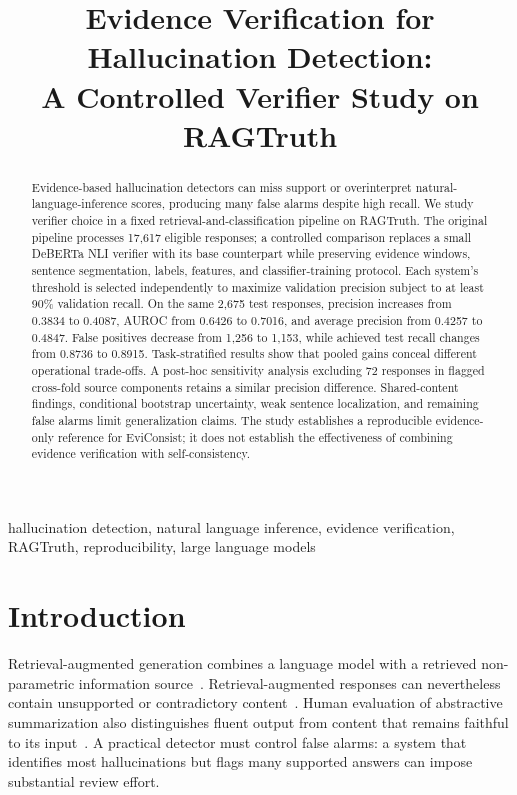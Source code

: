 \documentclass[conference,a4paper]{IEEEtran}
\title{Evidence Verification for Hallucination Detection:\\A Controlled Verifier Study on RAGTruth}
\author{\IEEEauthorblockN{Shreyanshu Ranjan, Yash Raj, Shubham Singh,\\Sukrit Srivastava, and Sparsh Bajoria}
\IEEEauthorblockA{School of Computer Science, KIIT Deemed to be University\\
\{2305013,2305019,2305084,2305093,2329214\}@kiit.ac.in}}
\begin{document}
\maketitle
\begin{abstract}
Evidence-based hallucination detectors can miss support or overinterpret natural-language-inference scores, producing many false alarms despite high recall. We study verifier choice in a fixed retrieval-and-classification pipeline on RAGTruth. The original pipeline processes 17,617 eligible responses; a controlled comparison replaces a small DeBERTa NLI verifier with its base counterpart while preserving evidence windows, sentence segmentation, labels, features, and classifier-training protocol. Each system's threshold is selected independently to maximize validation precision subject to at least 90\% validation recall. On the same 2,675 test responses, precision increases from 0.3834 to 0.4087, AUROC from 0.6426 to 0.7016, and average precision from 0.4257 to 0.4847. False positives decrease from 1,256 to 1,153, while achieved test recall changes from 0.8736 to 0.8915. Task-stratified results show that pooled gains conceal different operational trade-offs. A post-hoc sensitivity analysis excluding 72 responses in flagged cross-fold source components retains a similar precision difference. Shared-content findings, conditional bootstrap uncertainty, weak sentence localization, and remaining false alarms limit generalization claims. The study establishes a reproducible evidence-only reference for EviConsist; it does not establish the effectiveness of combining evidence verification with self-consistency.
\end{abstract}
\begin{IEEEkeywords}
hallucination detection, natural language inference, evidence verification, RAGTruth, reproducibility, large language models
\end{IEEEkeywords}

\section{Introduction}
Retrieval-augmented generation combines a language model with a retrieved non-parametric information source~\cite{lewisrag}.
Retrieval-augmented responses can nevertheless contain unsupported or contradictory content~\cite{ragtruth}.
Human evaluation of abstractive summarization also distinguishes fluent output from content that remains faithful to its input~\cite{maynez}.
A practical detector must control false alarms: a system that identifies most hallucinations but flags many supported answers can impose substantial review effort.
\end{document}
